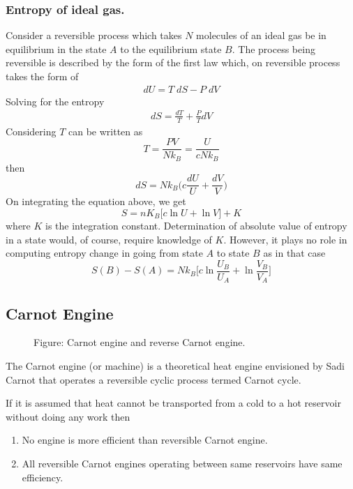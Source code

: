 \documentclass[../../../Main.tex]{subfiles}
\begin{document}
\subsubsection{Entropy of ideal gas.} Consider a reversible process which takes $N$ molecules of an ideal gas be in equilibrium in the state $A$ to the equilibrium state $B$. The process being reversible is described by the form of the first law which, on reversible process takes the form of 
\begin{eqnarray}
    dU=T\;dS-P\;dV
\end{eqnarray}
Solving for the entropy
\begin{eqnarray}
    dS=\frac{dT}{T}+\frac{P}{T}dV
\end{eqnarray}
Considering $T$ can be written as
\begin{equation*}
    T=\frac{PV}{Nk_B}=\frac{U}{cNk_B}
\end{equation*}
then 
\begin{equation*}
    dS=Nk_B\biggl(c\frac{dU}{U}+\frac{dV}{V}\biggr)
\end{equation*}
On integrating the equation above, we get
\begin{equation*}
    S=nK_B\bigl[c\ln U+\ln V\bigr]+K
\end{equation*}
where $K$ is the integration constant. Determination of absolute value of entropy in a state would, of course, require knowledge of $K$. However, it plays no role in computing entropy change in going from state $A$ to state $B$ as in that case
\begin{equation*}
    S(B)-S(A)=Nk_B \biggl[c\ln\frac{U_B}{U_A}+\ln\frac{V_B}{V_A}\biggr]
\end{equation*}

\subsection{Carnot Engine}
\begin{figure}
    \centering
    \caption*{Figure: Carnot engine and reverse Carnot engine.}
\end{figure}
The Carnot engine (or machine) is a theoretical heat engine envisioned by Sadi Carnot that operates a reversible cyclic process termed Carnot cycle.

If it is assumed that heat cannot be transported from a cold to a hot reservoir without doing any work then
\begin{enumerate}
    \item No engine is more efficient than reversible Carnot engine.
    \item All reversible Carnot engines operating between same reservoirs have same efficiency. 
\end{enumerate}
\end{document}
